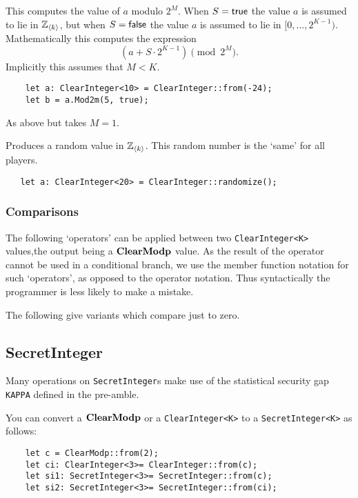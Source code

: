This computes the value of $a$ modulo $2^M$.
When $S={\mathsf{true}}$ the value $a$ is assumed to lie in ${\mathbb{Z}}_{\langle k \rangle}$,
but when $S={\mathsf{false}}$ the value $a$ is assumed to lie in $[0,\ldots,2^{K-1})$.
Mathematically this computes the expression
\[  \left( a + S \cdot 2^{K-1} \right) \pmod 2^M. \]
Implicitly this assumes that $M < K$.
\begin{lstlisting}
    let a: ClearInteger<10> = ClearInteger::from(-24);
    let b = a.Mod2m(5, true);
\end{lstlisting}

As above but takes $M=1$.


Produces a random value in ${\mathbb{Z}}_{\langle k \rangle}$.
This random number is the `same' for all players.
\begin{lstlisting}
   let a: ClearInteger<20> = ClearInteger::randomize();
\end{lstlisting}

\subsubsection{Comparisons}
The following `operators' can be applied between two \verb|ClearInteger<K>|
values,the output being a $\mathbf{ClearModp}$ value.
As the result of the operator cannot be used in a conditional branch,
we use the member function notation for such `operators', as opposed
to the operator notation. Thus syntactically the programmer is less
likely to make a mistake.

\noindent
The following give variants which compare just to zero.




\subsection{SecretInteger}
Many operations on \verb|SecretInteger|s make use of the statistical
security gap \verb|KAPPA| defined in the pre-amble.

You can convert a $\mathbf{ClearModp}$ or a \verb|ClearInteger<K>| to a
\verb|SecretInteger<K>|
as follows:
\begin{lstlisting}
    let c = ClearModp::from(2);
    let ci: ClearInteger<3>= ClearInteger::from(c);
    let si1: SecretInteger<3>= SecretInteger::from(c);
    let si2: SecretInteger<3>= SecretInteger::from(ci);
\end{lstlisting}

